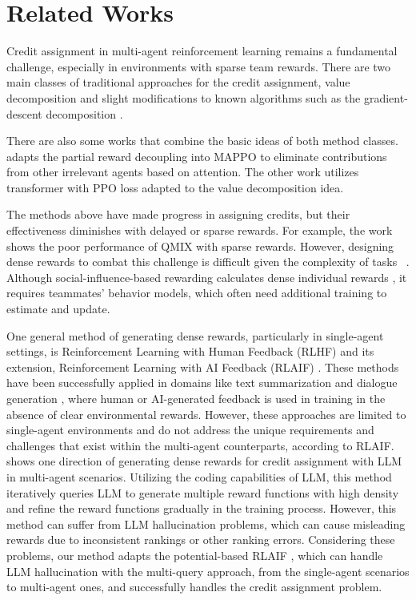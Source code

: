 \section{Related Works}
Credit assignment in multi-agent reinforcement learning remains a fundamental challenge, especially in environments with sparse team rewards. There are two main classes of traditional approaches for the credit assignment, value decomposition \cite{sunehag2017value, rashid2020monotonicvaluefunctionfactorisation, du2019liir, foerster2018counterfactual} and slight modifications to known algorithms such as the gradient-descent decomposition \cite{su2020valuedecompositionmultiagentactorcritics}. 

There are also some works that combine the basic ideas of both method classes. \cite{kapoor2024assigningcreditpartialreward} adapts the partial reward decoupling into MAPPO \cite{yu2022surprisingeffectivenessppocooperative} to eliminate contributions from other irrelevant agents based on attention. The other work \cite{wen2022multiagentreinforcementlearningsequence} utilizes transformer with PPO loss \cite{schulman2017proximal} adapted to the value decomposition idea.

The methods above have made progress in assigning credits, but their effectiveness diminishes with delayed or sparse rewards. For example, the work \cite{liu2023lazy} shows the poor performance of QMIX \cite{rashid2020monotonicvaluefunctionfactorisation} with sparse rewards. However, designing dense rewards to combat this challenge is difficult given the complexity of tasks ~\cite{leike2018scalable, knox2023reward, booth2023perils}. Although social-influence-based rewarding calculates dense individual rewards \cite{jaques2019social}, it requires teammates' behavior models, which often need additional training to estimate and update.

One general method of generating dense rewards, particularly in single-agent settings, is Reinforcement Learning with Human Feedback (RLHF) \cite{christiano2017deep} and its extension, Reinforcement Learning with AI Feedback (RLAIF) \cite{leerlaif}. These methods have been successfully applied in domains like text summarization and dialogue generation \cite{ziegler2020finetuninglanguagemodelshuman}, where human or AI-generated feedback is used in training in the absence of clear environmental rewards. However, these approaches are limited to single-agent environments and do not address the unique requirements and challenges that exist within the multi-agent counterparts, according to RLAIF. \cite{zhangsimple} shows one direction of generating dense rewards for credit assignment with LLM in multi-agent scenarios. Utilizing the coding capabilities of LLM, this method iteratively queries LLM to generate multiple reward functions with high density and refine the reward functions gradually in the training process. However, this method can suffer from LLM hallucination problems, which can cause misleading rewards due to inconsistent rankings or other ranking errors. Considering these problems, our method adapts the potential-based RLAIF \cite{lin2024navigating}, which can handle LLM hallucination with the multi-query approach, from the single-agent scenarios to multi-agent ones, and successfully handles the credit assignment problem.